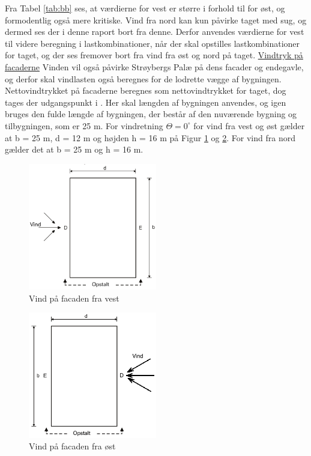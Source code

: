 Fra Tabel \ref{tab:bb} ses, at værdierne for vest er større i forhold til for øst, og formodentlig også mere kritiske. Vind fra nord kan kun påvirke taget med sug, og dermed ses der i denne raport bort fra denne. Derfor anvendes værdierne for vest til videre beregning i lastkombinationer, når der skal opstilles lastkombinationer for taget, og der ses fremover bort fra vind fra øst og nord på taget.
\newline
\newline
\underline{Vindtryk på facaderne}
\newline
Vinden vil også påvirke Strøybergs Palæ på dens facader og endegavle, og derfor skal vindlasten også beregnes for de lodrette vægge af bygningen.
\newline \indent{     }  Nettovindtrykket på facaderne beregnes som nettovindtrykket for taget, dog tages der udgangspunkt i \citep[ tabel 7.1]{EU91}. Her skal længden af bygningen anvendes, og igen bruges den fulde længde af bygningen, der består af den nuværende bygning og tilbygningen, som er 25 m. 
\newline
\newline
For vindretning $\Theta = 0^{\circ}$ for vind fra vest og øst gælder at b = 25 m, d = 12 m og højden h = 16 m på Figur \ref{fig:vindvest} og \ref{fig:vindost}. For vind fra nord gælder det at b = 25 m og h = 16 m.

\begin{figure}[htbp]
	\centering
	\includegraphics[width=0.5\textwidth]{billeder/vindvest1.png}
	\caption{Vind på facaden fra vest}
	\label{fig:vindvest}
\end{figure}

\begin{figure}[htbp]
	\centering
	\includegraphics[width=0.5\textwidth]{billeder/vindost1.png}
	\caption{Vind på facaden fra øst}
	\label{fig:vindost}
\end{figure}

